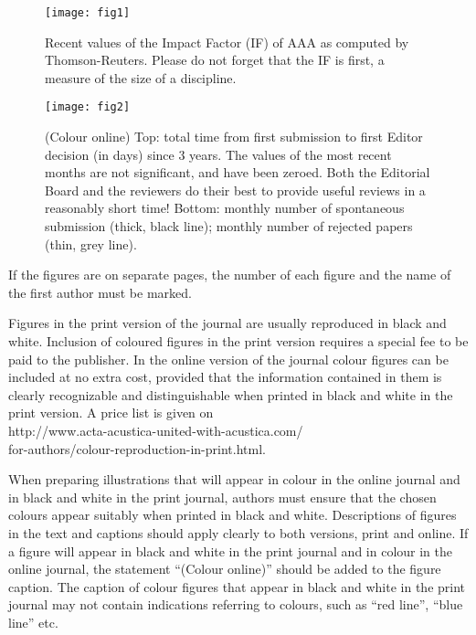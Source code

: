 \documentclass[twocolumn]{article}
\begin{document}
\begin{figure}
\centering
\texttt{[image: fig1]}
\caption{Recent values of the Impact Factor (IF) of AAA as computed by
Thomson-Reuters. Please do not forget that the IF is first, a measure of
the size of a discipline.}
\label{fig1}
\end{figure}

\begin{figure}
\centering
\texttt{[image: fig2]}
\caption{(Colour online) Top: total time from first submission to first
Editor decision (in days) since 3 years. The values of the most recent
months are not significant, and have been zeroed. Both the Editorial
Board and the reviewers do their best to provide useful reviews in a
reasonably short time! Bottom: monthly number of spontaneous submission
(thick, black line); monthly number of rejected papers (thin, grey
line). }
\label{fig2}
\end{figure}

If the figures are on separate pages, the number of each figure and the
name of the first author must be marked.

Figures in the print version of the journal are usually reproduced in
black and white. Inclusion of coloured figures in the print version
requires a special fee to be paid to the publisher. In the online
version of the journal colour figures can be included at no extra cost,
provided that the information contained in them is clearly recognizable
and distinguishable when printed in black and white in the print
version. A price list is given on \\
http://www.acta-acustica-united-with-acustica.com/\\
\hspace*{24pt}for-authors/colour-reproduction-in-print.html.

When preparing illustrations that will appear in colour in the online
journal and in black and white in the print journal, authors must ensure
that the chosen colours appear suitably when printed in black and white.
Descriptions of figures in the text and captions should apply clearly to
both versions, print and online. If a figure will appear in black and
white in the print journal and in colour in the online journal, the
statement ``(Colour online)'' should be added to the figure caption. The
caption of colour figures that appear in black and white in the print
journal may not contain indications referring to colours, such as ``red
line'', ``blue line'' etc.
\end{document}
